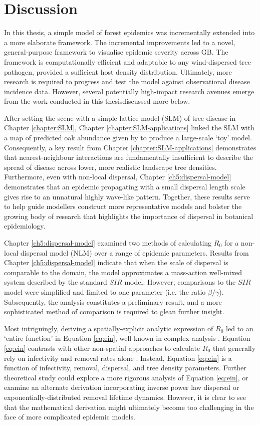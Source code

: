 
\chapter{Discussion}

In this thesis, a simple model of forest epidemics was incrementally extended into a more elaborate framework.
The incremental improvements led to a novel, general-purpose framework to visualise epidemic severity across GB.
The framework is computationally efficient and adaptable to any wind-dispersed tree pathogen, provided a sufficient host density distribution.
Ultimately, more research is required to progress and test the model against observational disease incidence data.
However, several potentially high-impact research avenues emerge from the work conducted in this thesis\textemdash discussed more below.

After setting the scene with a simple lattice model (SLM) of tree disease in Chapter \ref{chapter:SLM}, 
Chapter \ref{chapter:SLM-applications} linked the SLM with a map of predicted oak abundance given by \cite{hill.data} to produce a large-scale `toy' model.
Consequently, a key result from Chapter \ref{chapter:SLM-applications} demonstrates that nearest-neighbour interactions are
fundamentally insufficient to describe the spread of disease across lower, more realistic landscape tree densities. 
Furthermore, even with non-local dispersal, Chapter \ref{ch5:dispersal-model} demonstrates that an epidemic propagating with a small dispersal length scale gives rise to an unnatural highly wave-like pattern. Together, these results serve to help guide modellers construct more representative models and bolster the growing body of research that highlights the importance of dispersal in botanical epidemiology.

Chapter \ref{ch5:dispersal-model} examined two methods of calculating $R_0$ for a non-local dispersal model (NLM) over a range of epidemic parameters.
Results from Chapter \ref{ch5:dispersal-model} indicate that when the scale of dispersal is comparable to the domain, the model approximates a mass-action well-mixed system described by the standard $SIR$ model. However, comparisons to the $SIR$ model were simplified and limited to one parameter (i.e. the ratio $\beta/\gamma$). Subsequently, the analysis constitutes a preliminary result, and a more sophisticated method of comparison is required to glean further insight.

Most intriguingly, deriving a spatially-explicit analytic expression of $R_0$ led to an `entire function' in Equation \ref{eq:ein}, well-known in complex analysis \cite{abramowitz1948handbook}. 
Equation \ref{eq:ein} contrasts with other non-spatial approaches to calculate $R_0$ that generally rely on infectivity and removal rates alone \cite{...}.
Instead, Equation \ref{eq:ein} is a function of infectivity, removal, dispersal, and tree density parameters.
Further theoretical study could explore a more rigorous analysis of Equation \ref{eq:ein}, or examine an alternate derivation incorporating inverse power law dispersal or exponentially-distributed removal lifetime dynamics.
However, it is clear to see that the mathematical derivation might ultimately become too challenging in the face of more complicated epidemic models. 

